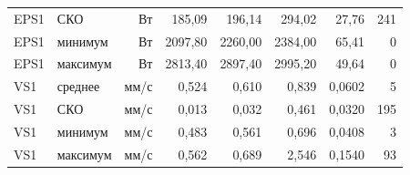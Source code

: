 \begin{table}[!t]
{\begin{tabular}{llrrrrrr}
EPS1 & СКО & Вт & 185,09 & 196,14 & 294,02 & 27,76 & 241 \\
EPS1 & минимум & Вт & 2097,80 & 2260,00 & 2384,00 & 65,41 & 0 \\
EPS1 & максимум & Вт & 2813,40 & 2897,40 & 2995,20 & 49,64 & 0 \\
\midrule
VS1 & среднее & мм/с & 0,524 & 0,610 & 0,839 & 0,0602 & 5 \\
VS1 & СКО & мм/с & 0,013 & 0,032 & 0,461 & 0,0320 & 195 \\
VS1 & минимум & мм/с & 0,483 & 0,561 & 0,696 & 0,0408 & 3 \\
VS1 & максимум & мм/с & 0,562 & 0,689 & 2,546 & 0,1540 & 93 \\
\bottomrule
\end{tabular}}
\par{}
\end{table}
